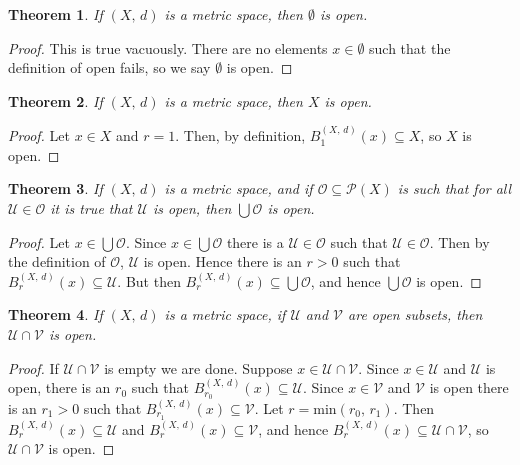\documentclass{article}
\theoremstyle{plain}
\newtheorem{theorem}{Theorem}[section]
\theoremstyle{normal}
\begin{document}
        \begin{theorem}
            If $(X,\,d)$ is a metric space, then $\emptyset$ is open.
        \end{theorem}
        \begin{proof}
            This is true vacuously. There are no elements
            $x\in\emptyset$ such that the definition of open fails, so
            we say $\emptyset$ is open.
        \end{proof}
        \begin{theorem}
            If $(X,\,d)$ is a metric space, then
            $X$ is open.
        \end{theorem}
        \begin{proof}
            Let $x\in{X}$ and $r=1$. Then, by definition,
            $B_{1}^{(X,\,d)}(x)\subseteq{X}$, so $X$ is open.
        \end{proof}
        \begin{theorem}
            If $(X,\,d)$ is a metric space, and if
            $\mathcal{O}\subseteq\mathcal{P}(X)$ is such that for all
            $\mathcal{U}\in\mathcal{O}$ it is true that $\mathcal{U}$ is open,
            then $\bigcup\mathcal{O}$ is open.
        \end{theorem}
        \begin{proof}
            Let $x\in\bigcup\mathcal{O}$. Since $x\in\bigcup\mathcal{O}$
            there is a $\mathcal{U}\in\mathcal{O}$ such that
            $\mathcal{U}\in\mathcal{O}$. Then by the definition of
            $\mathcal{O}$, $\mathcal{U}$ is open. Hence there is an
            $r>0$ such that $B_{r}^{(X,\,d)}(x)\subseteq\mathcal{U}$.
            But then $B_{r}^{(X,\,d)}(x)\subseteq\bigcup\mathcal{O}$, and
            hence $\bigcup\mathcal{O}$ is open.
        \end{proof}
        \begin{theorem}
            If $(X,\,d)$ is a metric space, if $\mathcal{U}$ and
            $\mathcal{V}$ are open subsets, then
            $\mathcal{U}\cap\mathcal{V}$ is open.
        \end{theorem}
        \begin{proof}
            If $\mathcal{U}\cap\mathcal{V}$ is empty we are done.
            Suppose $x\in\mathcal{U}\cap\mathcal{V}$. Since
            $x\in\mathcal{U}$ and $\mathcal{U}$ is open, there is an
            $r_{0}$ such that
            $B_{r_{0}}^{(X,\,d)}(x)\subseteq\mathcal{U}$. Since
            $x\in\mathcal{V}$ and $\mathcal{V}$ is open there is an
            $r_{1}>0$ such that $B_{r_{1}}^{(X,\,d)}(x)\subseteq\mathcal{V}$.
            Let $r=\textrm{min}(r_{0},\,r_{1})$. Then
            $B_{r}^{(X,\,d)}(x)\subseteq\mathcal{U}$ and
            $B_{r}^{(X,\,d)}(x)\subseteq\mathcal{V}$, and hence
            $B_{r}^{(X,\,d)}(x)\subseteq\mathcal{U}\cap\mathcal{V}$, so
            $\mathcal{U}\cap\mathcal{V}$ is open.
        \end{proof}
\end{document}
